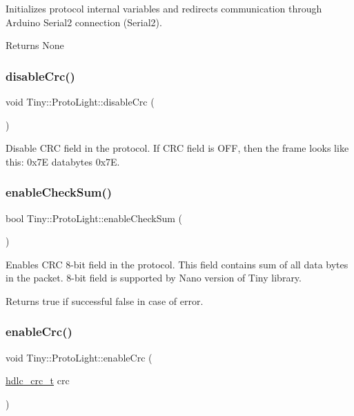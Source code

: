 Initializes protocol internal variables and redirects communication through Arduino Serial2 connection (Serial2). \begin{DoxyReturn}{Returns}
None 
\end{DoxyReturn}
\mbox{\label{classTiny_1_1ProtoLight_af93e0591ca33137ad79ffb054953001c}} 
\subsubsection{\texorpdfstring{disable\+Crc()}{disableCrc()}}
{\footnotesize\ttfamily void Tiny\+::\+Proto\+Light\+::disable\+Crc (\begin{DoxyParamCaption}{ }\end{DoxyParamCaption})}

Disable C\+RC field in the protocol. If C\+RC field is O\+FF, then the frame looks like this\+: 0x7E databytes 0x7E. \mbox{\label{classTiny_1_1ProtoLight_ad7b4ef5a43c187f0d1915efe7450bc40}} 
\subsubsection{\texorpdfstring{enable\+Check\+Sum()}{enableCheckSum()}}
{\footnotesize\ttfamily bool Tiny\+::\+Proto\+Light\+::enable\+Check\+Sum (\begin{DoxyParamCaption}{ }\end{DoxyParamCaption})}

Enables C\+RC 8-\/bit field in the protocol. This field contains sum of all data bytes in the packet. 8-\/bit field is supported by Nano version of Tiny library. \begin{DoxyReturn}{Returns}
true if successful false in case of error. 
\end{DoxyReturn}
\mbox{\label{classTiny_1_1ProtoLight_a5232e938a70c64eb7fbb8908509cd3fa}} 
\subsubsection{\texorpdfstring{enable\+Crc()}{enableCrc()}}
{\footnotesize\ttfamily void Tiny\+::\+Proto\+Light\+::enable\+Crc (\begin{DoxyParamCaption}\item[{\hyperlink{group__HDLC__API_gabb73b32d08d8e79eefe9385634a74bf7}{hdlc\+\_\+crc\+\_\+t}}]{crc }\end{DoxyParamCaption})}

